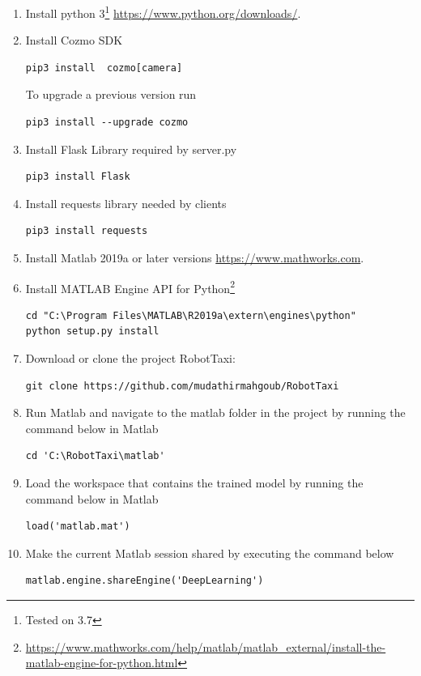 \documentclass[12pt,a4paper]{article}
\begin{document}
\begin{enumerate}
\item Install python 3\footnote{Tested on 3.7} \url{https://www.python.org/downloads/}.
\item Install Cozmo SDK 
\begin{verbatim}
pip3 install  cozmo[camera]
\end{verbatim}
To upgrade a previous version run 
\begin{verbatim}
pip3 install --upgrade cozmo
\end{verbatim}
\item Install Flask Library required by server.py
\begin{verbatim}
pip3 install Flask
\end{verbatim}
\item Install requests library needed by clients
\begin{verbatim}
pip3 install requests
\end{verbatim}

\item Install Matlab 2019a or later versions \url{https://www.mathworks.com}.
\item Install MATLAB Engine API for Python\footnote{\url{https://www.mathworks.com/help/matlab/matlab_external/install-the-matlab-engine-for-python.html}}
\begin{verbatim}
cd "C:\Program Files\MATLAB\R2019a\extern\engines\python"
python setup.py install
\end{verbatim}
\item Download or clone the project RobotTaxi:
\begin{verbatim}
git clone https://github.com/mudathirmahgoub/RobotTaxi
\end{verbatim}
\item Run Matlab and navigate to the matlab folder in the project by running the command below in Matlab
\begin{verbatim}
cd 'C:\RobotTaxi\matlab'
\end{verbatim}

\item Load the workspace that contains the trained model by running the command below in Matlab 
\begin{verbatim}
load('matlab.mat')
\end{verbatim}
\item Make the current Matlab session shared by executing the command below
\begin{verbatim}
matlab.engine.shareEngine('DeepLearning')
\end{verbatim}


\end{enumerate}
\end{document}
